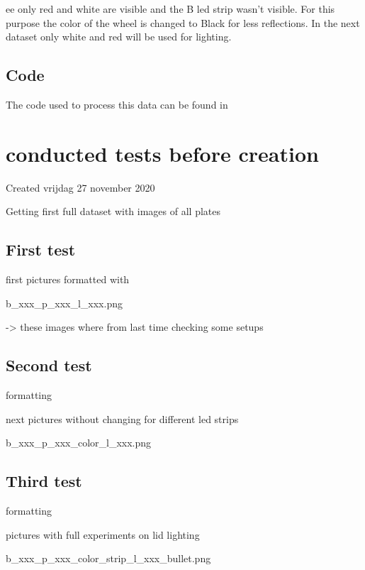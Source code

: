 ee only red and white are visible and the B led strip wasn't visible. For this purpose the color of the wheel is changed to Black for less reflections. In the next dataset only white and red will be used for lighting. 



\subsection{Code}

The code used to process this data can be found in 


		\section{conducted tests before creation}

Created vrijdag 27 november 2020



Getting first full dataset with images of all plates



\subsection{First test}

first pictures formatted with 

b\_xxx\_p\_xxx\_l\_xxx.png

	-\textgreater{} these images where from last time checking some setups
	
	



\subsection{Second test}

formatting 

next pictures without changing for different led strips

b\_xxx\_p\_xxx\_color\_l\_xxx.png



\subsection{Third test}

formatting

pictures with full experiments on lid lighting

b\_xxx\_p\_xxx\_color\_strip\_l\_xxx\_bullet.png

